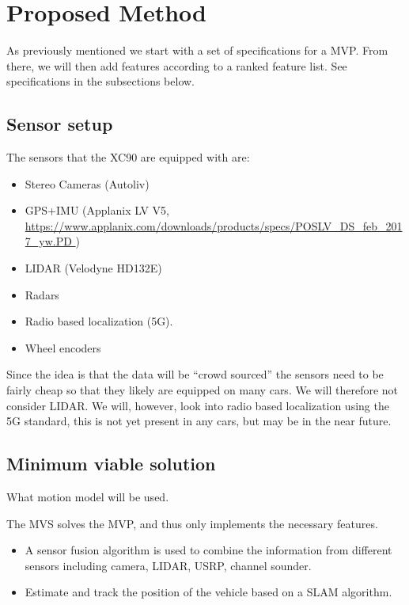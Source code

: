 \section{Proposed Method}

As previously mentioned we start with a set of specifications for a \gls{MVP}. From there, we will then add features according to a ranked feature list. See specifications in the subsections below.

\subsection{Sensor setup}\label{sec:sensor-setup}
The sensors that the XC90 are equipped with are:
\begin{itemize}
\item Stereo Cameras (Autoliv)
\item GPS+IMU (Applanix LV V5,
  \url{https://www.applanix.com/downloads/products/specs/POSLV_DS_feb_2017_yw.PD
  })
\item  \gls{LIDAR} (Velodyne HD132E)
\item  Radars
\item  Radio based localization (5G).
\item  Wheel encoders
\end{itemize}

Since the idea is that the data will be “crowd sourced” the sensors
need to be fairly cheap so that they likely are equipped on many
cars. We will therefore not consider \gls{LIDAR}. We will, however, look
into radio based localization using the 5G standard, this is not yet
present in any cars, but may be in the near future.



\subsection{Minimum viable solution}

What motion model will be used. 


The \gls{MVS} solves the \gls{MVP}, and thus only implements the necessary
features.
\begin{itemize}
\item A sensor fusion algorithm is used to combine the information
  from different sensors including camera, LIDAR, USRP, channel
  sounder.
\item Estimate and track the position of the vehicle based on a SLAM
  algorithm.
\end{itemize}

